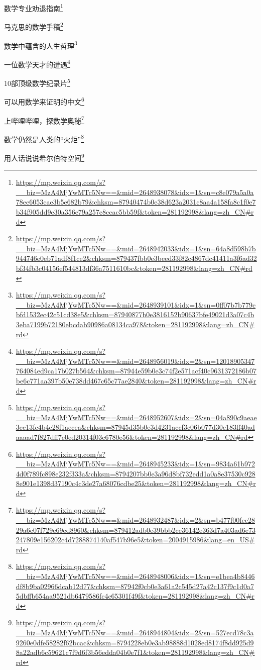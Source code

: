 \documentclass[]{ctexbook}
\renewcommand{\href}[2]{#2\footnote{\url{#1}}}
\begin{document}
\href{https://mp.weixin.qq.com/s?__biz=MzA4MjYwMTc5Nw==\&mid=2648938078\&idx=1\&sn=c8e079a5a0a78ee6053cae3b5e682b79\&chksm=87940474b0e38d623a2031c8aa4a158fa8c1f0e7b34f905dd9e30a356e79a257c8ccac5bb59f\&token=281192998\&lang=zh_CN\#rd}{数学专业劝退指南}

\href{https://mp.weixin.qq.com/s?__biz=MzA4MjYwMTc5Nw==\&mid=2648942033\&idx=1\&sn=64a8d598b7b944746e0eb71adf8f1ce2\&chksm=879437fbb0e3beed33f82c4867dc41411a3f6ad32bf34fb3c04156ef544813df36a7511610bc\&token=281192998\&lang=zh_CN\#rd}{马克思的数学手稿}

\href{https://mp.weixin.qq.com/s?__biz=MzA4MjYwMTc5Nw==\&mid=2648939101\&idx=1\&sn=0ff07b7b779cbfd1532ec42c51cd38e5\&chksm=87940877b0e3816152b90637bfe49021d3a07c4b3eba7199b72180ebcdab90986a08134ca978\&token=281192998\&lang=zh_CN\#rd}{数学中蕴含的人生哲理}

\href{https://mp.weixin.qq.com/s?__biz=MzA4MjYwMTc5Nw==\&mid=2648956019\&idx=2\&sn=12018905347764084ed9ca17b027b564\&chksm=87944e59b0e3c74f2e571acf40c9631372186b07be6c771aa397b50e738dd467c65c77ae2840\&token=281192998\&lang=zh_CN\#rd}{一位数学天才的遭遇}

\href{https://mp.weixin.qq.com/s?__biz=MzA4MjYwMTc5Nw==\&mid=2648952607\&idx=2\&sn=04a890c9aeae3ec13fc4b4e28f1aecea\&chksm=87945d35b0e3d4231accf3c06b077d30c183ff40adaaaad7f827dff7e0ed20314f03c6780e56\&token=281192998\&lang=zh_CN\#rd}{10部顶级数学纪录片}

\href{https://mp.weixin.qq.com/s?__biz=MzA4MjYwMTc5Nw==\&mid=2648945233\&idx=1\&sn=9834a61b9724d0f789fc898e232f333a\&chksm=8794207bb0e3a96d8bf732edd1a0a8e37530c9288e901e1398d37190c4c3de27a68076cdbe25\&token=281192998\&lang=zh_CN\#rd}{可以用数学来证明的中文}

\href{https://mp.weixin.qq.com/s?__biz=MzA4MjYwMTc5Nw==\&mid=2648932487\&idx=2\&sn=b477f00fec2829a6c07f729e69ed8960\&chksm=879412adb0e39bbb2ce36142e363d7a403ad6e73247809e156202c4d7288874140af547b96e5\&token=2004915986\&lang=en_US\#rd}{上哔哩哔哩，探数学奥秘}

\href{https://mp.weixin.qq.com/s?__biz=MzA4MjYwMTc5Nw==\&mid=2648948006\&idx=1\&sn=e1bea4b8446df8b9ba02966dcab12d77\&chksm=87942f0cb0e3a61a2c545d27a42c137f9c1d0a75dbffb654aa9521db6479586fc4c65301f49f\&token=281192998\&lang=zh_CN\#rd}{数学仍然是人类的``火炬''}

\href{https://mp.weixin.qq.com/s?__biz=MzA4MjYwMTc5Nw==\&mid=2648944804\&idx=2\&sn=527ecd78c3a9260e0dfe58282f62bcac\&chksm=8794228eb0e3ab98888d1028ed8174f8dd925d98a22adb6c59621c7f9d6f3b56edda04b0e7f1\&token=281192998\&lang=zh_CN\#rd}{用人话说说希尔伯特空间}
\end{document}
